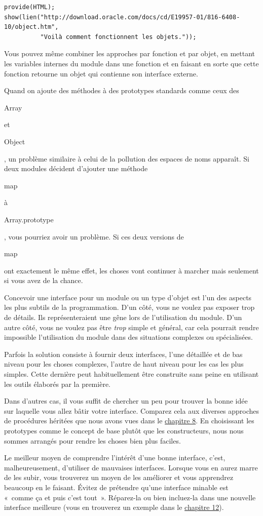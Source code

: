 \documentclass{FramateX}
\renewcommand{\texttt}[1]{\begin{sffamily}{#1}\end{sffamily}}
\begin{document}
\begin{lstlisting}
provide(HTML);
show(lien("http://download.oracle.com/docs/cd/E19957-01/816-6408-10/object.htm",
          "Voilà comment fonctionnent les objets."));
\end{lstlisting}
Vous pouvez même combiner les approches par fonction et par objet, en
mettant les variables internes du module dans une fonction et en faisant
en sorte que cette fonction retourne un objet qui contienne son
interface externe.

\begin{center}\end{center}

Quand on ajoute des méthodes à des prototypes standards comme ceux des
\texttt{Array} et \texttt{Object}, un problème similaire à celui de la
pollution des espaces de noms apparaît. Si deux modules décident
d'ajouter une méthode \texttt{map} à \texttt{Array.prototype}, vous
pourriez avoir un problème. Si ces deux versions de \texttt{map} ont
exactement le même effet, les choses vont continuer à marcher mais
seulement si vous avez de la chance.

\begin{center}\end{center}

Concevoir une interface pour un module ou un type d'objet est l'un des
aspects les plus subtils de la programmation. D'un côté, vous ne voulez
pas exposer trop de détails. Ils représenteraient une gêne lors de
l'utilisation du module. D'un autre côté, vous ne voulez pas être
\emph{trop} simple et général, car cela pourrait rendre impossible
l'utilisation du module dans des situations complexes ou spécialisées.

Parfois la solution consiste à fournir deux interfaces, l'une détaillée
et de bas niveau pour les choses complexes, l'autre de haut niveau pour
les cas les plus simples. Cette dernière peut habituellement être
construite sans peine en utilisant les outils élaborés par la première.

Dans d'autres cas, il vous suffit de chercher un peu pour trouver la
bonne idée sur laquelle vous allez bâtir votre interface. Comparez cela
aux diverses approches de procédures héritées que nous avons vues dans
le \href{chapter8.html}{chapitre 8}. En choisissant les prototypes comme
le concept de base plutôt que les constructeurs, nous nous sommes
arrangés pour rendre les choses bien plus faciles.

Le meilleur moyen de comprendre l'intérêt d'une bonne interface, c'est,
malheureusement, d'utiliser de mauvaises interfaces. Lorsque vous en
aurez marre de les subir, vous trouverez un moyen de les améliorer et
vous apprendrez beaucoup en le faisant. Évitez de prétendre qu'une
interface minable est «~comme ça et puis c'est tout~». Réparez-la ou
bien incluez-la dans une nouvelle interface meilleure (vous en trouverez
un exemple dans le \href{chapter12.html}{chapitre 12}).
\end{document}
